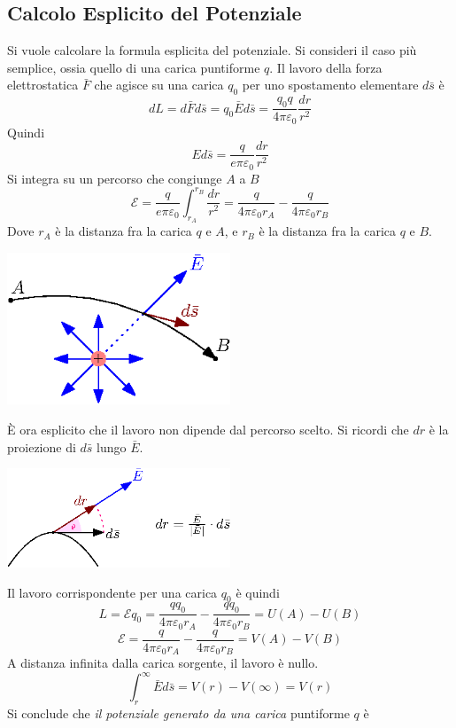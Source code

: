 \documentclass[10pt, letterpaper]{report}
\begin{document}
\subsection{Calcolo Esplicito del Potenziale}
Si vuole calcolare la formula esplicita del potenziale. Si consideri il caso più semplice, ossia quello di una carica puntiforme $q$. Il lavoro della forza elettrostatica $\bar F$ che agisce su una carica $q_0$ per uno spostamento elementare $d\bar s$ è 
$$ dL = d\bar F d\bar s =q_0\bar Ed\bar s= \frac{q_0q}{4\pi\varepsilon_0}\frac{dr}{r^2}$$
Quindi 
$$ Ed\bar s=\frac{q}{e\pi\varepsilon_0}\frac{dr}{r^2}$$
Si integra su un percorso che congiunge $A$ a $B$
$$ \mathscr{E}=\frac{q}{e\pi\varepsilon_0}\int_{r_A}^{r_B}\frac{dr}{r^2}=\frac{q}{4\pi\varepsilon_0r_A}-\frac{q}{4\pi\varepsilon_0r_B}$$
Dove $r_A$ è la distanza fra la carica $q$ e $A$, e $r_B$ è la distanza fra la carica $q$ e $B$. \begin{center}
    \includegraphics[width=0.5\textwidth]{images/lavoroCampoEl.eps}
\end{center}
È ora esplicito che il lavoro non dipende dal percorso scelto. Si ricordi che $dr$ è la proiezione di $d\bar s$ lungo $\bar E$. \begin{center}
    \includegraphics[width=0.5\textwidth]{images/dr.eps}
\end{center}
Il lavoro corrispondente per una carica $q_0$ è quindi 
$$ L=\mathscr{E}q_0=\frac{qq_0}{4\pi\varepsilon_0r_A}-\frac{qq_0}{4\pi\varepsilon_0r_B}=U(A)-U(B)$$
$$ \mathscr{E}=\frac{q}{4\pi\varepsilon_0r_A}-\frac{q}{4\pi\varepsilon_0r_B}=V(A)-V(B)$$
A distanza infinita dalla carica sorgente, il lavoro è nullo. 
$$ \int_r^\infty \bar E   d\bar s= V(r)-V(\infty)=V(r)$$
Si conclude che \textit{il potenziale generato da una carica} puntiforme $q$ è 
\end{document}
